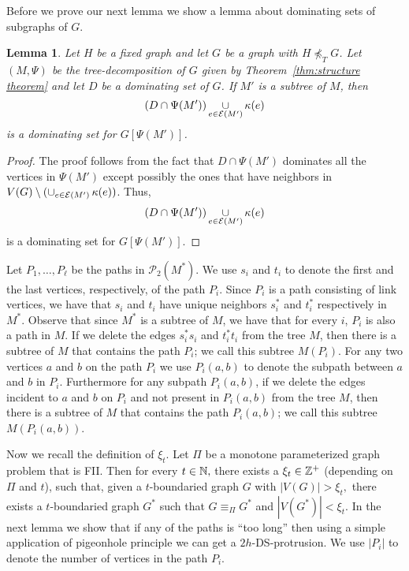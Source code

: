 \documentclass[11pt]{article}
\newtheorem{lemma}{Lemma}
\begin{document}
Before we prove our next lemma we show a lemma about dominating sets of subgraphs of $G$.
\begin{lemma}
\label{lem:smalldominatingset}
Let $H$ be a fixed graph and let $G$ be a graph with $H\not\preceq_T G$.  
Let $(M,\Psi)$ be the tree-decomposition of $G$ given by 
Theorem~\ref{thm:structure theorem} and let $D$ be a dominating set of $G$. If $M'$ is  a subtree of $M$,  then 
$$(D \cap \Psi(M') )\mathop{\cup}_{e\in {\cal E}(M')}\kappa(e)$$ is 
a dominating set for $G[\Psi(M')]$. 
\end{lemma}
\begin{proof}
The proof follows from the fact that $D \cap \Psi(M')$ dominates all the vertices in $\Psi(M')$ except possibly the ones that have 
neighbors in $V(G)\setminus (\mathop{\cup}_{e\in {\cal E}(M')}\kappa(e))$. Thus, $$(D \cap \Psi(M') )\mathop{\cup}_{e\in {\cal E}(M')}\kappa(e)$$ is 
a dominating set for $G[\Psi(M')]$. 
\end{proof}




Let $P_1, \ldots,P_\ell$ be the  paths in $ \mathscr{P}_2(M^*)$. We use $s_i$ and $t_i$ to denote the first  and the last vertices, respectively,  
of the path $P_i$. Since $P_i$ is a path consisting of link vertices,  we have that $s_i$ and $t_i$ have unique 
neighbors $s^*_i$ and $t^*_i$ respectively in $M^*$.  Observe that since $M^*$ is a subtree of $M$, we have that for every 
$i$, $P_i$ is also a path in $M$. 
If we delete the edges $s^*_is_i$ and $t^*_it_i$ from the tree $M$, then there is a subtree of $M$ that contains the path $P_i$; we call this subtree 
$M(P_i)$.  For any two vertices $a$ and $b$ on the path $P_i$ we use $P_i(a,b)$ to denote the subpath between $a$ and $b$ in $P_i$. 
Furthermore for  any subpath  $P_i(a,b)$, if we delete the edges incident to $a$  and $b$ on $P_i$ and not present in  $P_i(a,b)$ from the tree $M$, then there is a subtree of $M$ that contains the path $P_i(a,b)$; we call this subtree  $M(P_i(a,b))$.   


Now we recall the definition of $\xi_t$. Let $\Pi$ be a  monotone parameterized graph problem  that is FII. Then for every $t\in\Bbb{N},$ there exists a $ \xi_t \in\Bbb{Z}^{+}$ (depending on $\Pi$ and $t$), such that, given a $t$-boundaried graph $G$  with $|V(G)|>\xi_t,$  there exists a $t$-boundaried graph $G^*$  such that $G\equiv_{\Pi}G^*$ and  $|V(G^*)| < \xi_t$. 
In the next lemma we show that if any of the paths is ``too long'' then using a simple application of pigeonhole principle we can get a $2h$-{\sc DS}-protrusion. We use $|P_i|$ to denote the number of vertices in the path $P_i$.  
\end{document}
